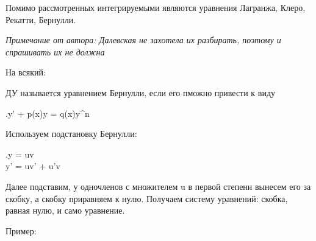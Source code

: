 \begin{remark}
  Помимо рассмотренных интегрируемыми являются уравнения Лагранжа, Клеро, Рекатти, Бернулли. 
\end{remark}

\textit{Примечание от автора: Далевская не захотела их разбирать, поэтому и спрашивать их не должна}

 На всякий:

ДУ называется уравнением Бернулли, если его пможно привести к виду 
\begin{lequation}
  .y' + p(x)y = q(x)y^n
\end{lequation}

Используем подстановку Бернулли:

\begin{lequation}
  .y = uv \\ y' = uv' + u'v
\end{lequation}

Далее подставим, у одночленов с множителем u в первой степени вынесем его за скобку, а скобку приравняем к нулю.
Получаем систему уравнений: скобка, равная нулю, и само уравнение. 

Пример:


